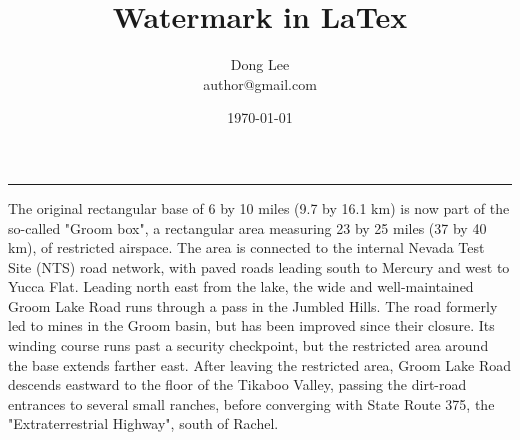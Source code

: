 \documentclass[12pt]{article}
\title{Watermark in LaTex}
\author{Dong Lee\\ author@gmail.com}
\date{\today}
\begin{document}
\NoBgThispage
\maketitle
\hrule
\clearpage
The original rectangular base of 6 by 10 miles (9.7 by 16.1 km) is now part of the so-called "Groom box", a rectangular area measuring 23 by 25 miles (37 by 40 km), of restricted airspace. The area is connected to the internal Nevada Test Site (NTS) road network, with paved roads leading south to Mercury and west to Yucca Flat. Leading north east from the lake, the wide and well-maintained Groom Lake Road runs through a pass in the Jumbled Hills. The road formerly led to mines in the Groom basin, but has been improved since their closure. Its winding course runs past a security checkpoint, but the restricted area around the base extends farther east. After leaving the restricted area, Groom Lake Road descends eastward to the floor of the Tikaboo Valley, passing the dirt-road entrances to several small ranches, before converging with State Route 375, the "Extraterrestrial Highway", south of Rachel.
\end{document}
